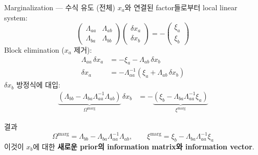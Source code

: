 \begin{frame}{Marginalization — 수식 유도 (전체)}
  $x_a$와 연결된 factor들로부터 local linear system:
  \[
    \begin{pmatrix}\Lambda_{aa} & \Lambda_{ab} \\ \Lambda_{ba} & \Lambda_{bb}\end{pmatrix}
    \begin{pmatrix}\delta x_a \\ \delta x_b\end{pmatrix}
    = -\begin{pmatrix}\xi_a \\ \xi_b\end{pmatrix}
  \]
  \pause
  Block elimination ($x_a$ 제거):
  \begin{align*}
    \Lambda_{aa}\,\delta x_a &= -\xi_a - \Lambda_{ab}\,\delta x_b \\
    \delta x_a &= -\Lambda_{aa}^{-1}(\xi_a + \Lambda_{ab}\,\delta x_b)
  \end{align*}
  \pause
  $\delta x_b$ 방정식에 대입:
  \begin{align*}
    \underbrace{(\Lambda_{bb} - \Lambda_{ba}\Lambda_{aa}^{-1}\Lambda_{ab})}_{\Omega^{\mathrm{marg}}}\,\delta x_b
    &= -\underbrace{(\xi_b - \Lambda_{ba}\Lambda_{aa}^{-1}\xi_a)}_{\xi^{\mathrm{marg}}}
  \end{align*}
  \pause
  \begin{block}{결과}
    \[
      \Omega^{\mathrm{marg}} = \Lambda_{bb} - \Lambda_{ba}\Lambda_{aa}^{-1}\Lambda_{ab}, \qquad
      \xi^{\mathrm{marg}} = \xi_b - \Lambda_{ba}\Lambda_{aa}^{-1}\xi_a
    \]
    이것이 $x_b$에 대한 \textbf{새로운 prior의 information matrix와 information vector}.
  \end{block}
\end{frame}

